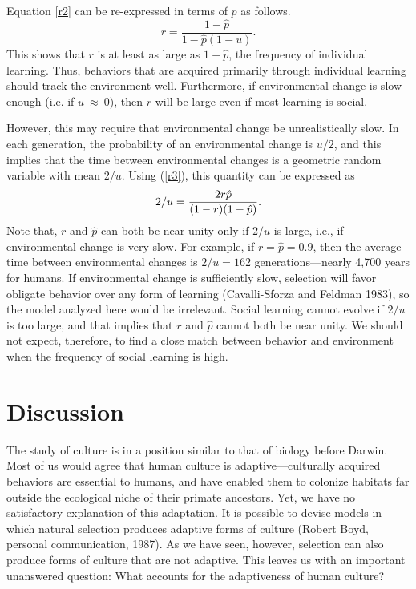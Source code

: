 \documentclass[11pt]{article}
\begin{document}
Equation \ref{r2} can be re-expressed in terms of $p$ as follows.
\begin{equation} \label{r3}
r = \frac{1 - \hat{p}}{1 - \hat{p} (1 - u)} .
\end{equation}
This shows that $r$ is at least as large as $1 - \hat{p}$, the frequency of
individual learning.  Thus, behaviors that are acquired primarily through
individual learning should track the environment well.  Furthermore, if
environmental change is slow enough (i.e. if $u~\approx~0$), then $r$ will
be large even if most learning is social.  

However, this may require that environmental change be unrealistically
slow.  In each generation, the probability of an environmental change is
$u/2$, and this implies that the time between environmental changes is a
geometric random variable with mean $2/u$.  Using (\ref{r3}), this
quantity can be expressed as 
\begin{equation}
2/u =  {2 r \hat{p} \over (1 - r)(1 - \hat{p} )} .
\end{equation}
Note that, $r$ and $\hat p$ can both be near unity only if $2/u$ is large,
i.e., if environmental change is very slow.  For example, if
$r=\hat{p}=0.9$, then the average time between environmental changes is
$2/u=162$ generations---nearly 4,700 years for humans.  If environmental
change is sufficiently slow, selection will favor obligate behavior over
any form of learning (Cavalli-Sforza and Feldman 1983), so the model
analyzed here would be irrelevant.  Social learning cannot evolve if $2/u$
is too large, and that implies that $r$ and $\hat p$ cannot both be near
unity.  We should not expect, therefore, to find a close match between
behavior and environment when the frequency of social learning is high.

\section{Discussion}

The study of culture is in a position similar to that of biology before
Darwin.  Most of us would agree that human culture is adaptive---culturally
acquired behaviors are essential to humans, and have enabled them to
colonize habitats far outside the ecological niche of their primate
ancestors.  Yet, we have no satisfactory explanation of this adaptation.
It is possible to devise models in which natural selection produces
adaptive forms of culture (Robert Boyd, personal communication, 1987).  As we 
have seen, however, selection can also produce forms of culture that are not
adaptive.  This leaves us with an important unanswered question: What
accounts for the adaptiveness of human culture?
\end{document}
